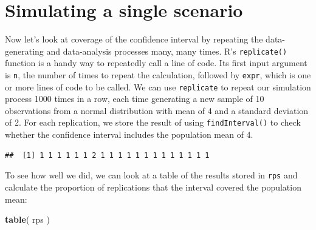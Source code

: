 \documentclass[
]{book}
\newenvironment{Shaded}{\begin{snugshade}}{\end{snugshade}}
\newcommand{\AttributeTok}[1]{\textcolor[rgb]{0.13,0.29,0.53}{#1}}
\newcommand{\DecValTok}[1]{\textcolor[rgb]{0.00,0.00,0.81}{#1}}
\newcommand{\FunctionTok}[1]{\textcolor[rgb]{0.13,0.29,0.53}{\textbf{#1}}}
\newcommand{\NormalTok}[1]{#1}
\newcommand{\OtherTok}[1]{\textcolor[rgb]{0.56,0.35,0.01}{#1}}
\newcommand{\SpecialCharTok}[1]{\textcolor[rgb]{0.81,0.36,0.00}{\textbf{#1}}}
\begin{document}
\section{Simulating a single scenario}\label{simulating-a-single-scenario}

Now let's look at coverage of the confidence interval by repeating the data-generating and data-analysis processes many, many times.
R's \texttt{replicate()} function is a handy way to repeatedly call a line of code.
Its first input argument is \texttt{n}, the number of times to repeat the calculation, followed by \texttt{expr}, which is one or more lines of code to be called.
We can use \texttt{replicate} to repeat our simulation process 1000 times in a row, each time generating a new sample of 10 observations from a normal distribution with mean of 4 and a standard deviation of 2.
For each replication, we store the result of using \texttt{findInterval()} to check whether the confidence interval includes the population mean of 4.

\begin{Shaded}
\end{Shaded}

\begin{verbatim}
##  [1] 1 1 1 1 1 1 2 1 1 1 1 1 1 1 1 1 1 1 1 1
\end{verbatim}

To see how well we did, we can look at a table of the results stored in \texttt{rps} and calculate the proportion of replications that the interval covered the population mean:

\begin{Shaded}
\begin{Highlighting}[]
\FunctionTok{table}\NormalTok{( rps )}
\end{Highlighting}
\end{Shaded}
\end{document}
